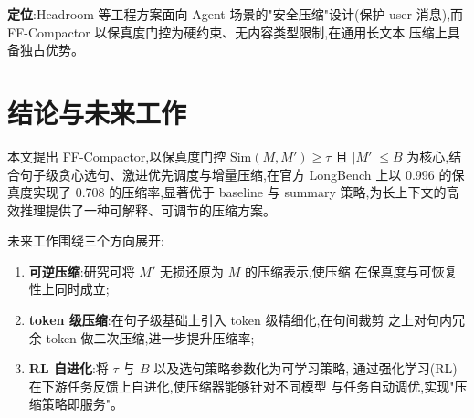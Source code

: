 \documentclass[11pt,a4paper]{article}
\begin{document}
\textbf{定位}:Headroom 等工程方案面向 Agent 场景的"安全压缩"设计(保护 user
消息),而 FF-Compactor 以保真度门控为硬约束、无内容类型限制,在通用长文本
压缩上具备独占优势。

\section{结论与未来工作}

本文提出 FF-Compactor,以保真度门控 $\mathrm{Sim}(M, M') \ge \tau$ 且
$|M'| \le B$ 为核心,结合句子级贪心选句、激进优先调度与增量压缩,在官方
LongBench 上以 0.996 的保真度实现了 0.708 的压缩率,显著优于 baseline 与
summary 策略,为长上下文的高效推理提供了一种可解释、可调节的压缩方案。

未来工作围绕三个方向展开:

\begin{enumerate}
  \item \textbf{可逆压缩}:研究可将 $M'$ 无损还原为 $M$ 的压缩表示,使压缩
        在保真度与可恢复性上同时成立;
  \item \textbf{token 级压缩}:在句子级基础上引入 token 级精细化,在句间裁剪
        之上对句内冗余 token 做二次压缩,进一步提升压缩率;
  \item \textbf{RL 自进化}:将 $\tau$ 与 $B$ 以及选句策略参数化为可学习策略,
        通过强化学习(RL)在下游任务反馈上自进化,使压缩器能够针对不同模型
        与任务自动调优,实现"压缩策略即服务"。
\end{enumerate}
\end{document}
